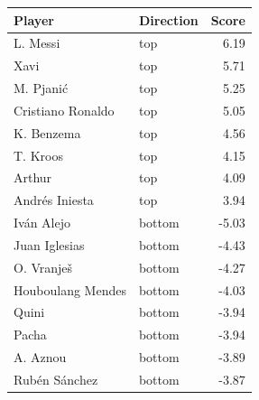 
\begin{tabular}{llr}
\toprule
Player & Direction & Score\\
\midrule
L. Messi & top & 6.19\\
Xavi & top & 5.71\\
M. Pjanić & top & 5.25\\
Cristiano Ronaldo & top & 5.05\\
K. Benzema & top & 4.56\\
T. Kroos & top & 4.15\\
Arthur & top & 4.09\\
Andrés Iniesta & top & 3.94\\
Iván Alejo & bottom & -5.03\\
Juan Iglesias & bottom & -4.43\\
O. Vranješ & bottom & -4.27\\
Houboulang Mendes & bottom & -4.03\\
Quini & bottom & -3.94\\
Pacha & bottom & -3.94\\
A. Aznou & bottom & -3.89\\
Rubén Sánchez & bottom & -3.87\\
\bottomrule
\end{tabular}
